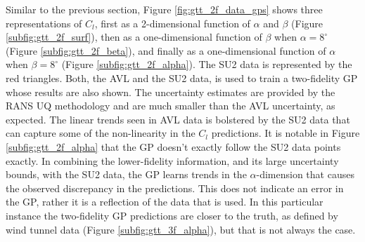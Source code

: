 Similar to the previous section, Figure \ref{fig:gtt_2f_data_gps} shows three representations of $C_l$, first as a 2-dimensional function of $\alpha$ and $\beta$ (Figure \ref{subfig:gtt_2f_surf}), then as a one-dimensional function of $\beta$ when $\alpha=8^\circ$ (Figure \ref{subfig:gtt_2f_beta}), and finally as a one-dimensional function of $\alpha$ when $\beta = 8^\circ$ (Figure \ref{subfig:gtt_2f_alpha}).
The SU2 data is represented by the red triangles. 
Both, the AVL and the SU2 data, is used to train a two-fidelity GP whose results are also shown. 
The uncertainty estimates are provided by the RANS UQ methodology and are much smaller than the AVL uncertainty, as expected. 
The linear trends seen in AVL data is bolstered by the SU2 data that can capture some of the non-linearity in the $C_l$ predictions. 
It is notable in Figure \ref{subfig:gtt_2f_alpha} that the GP doesn't exactly follow the SU2 data points exactly. 
In combining the lower-fidelity information, and its large uncertainty bounds, with the SU2 data, the GP learns trends in the $\alpha$-dimension that causes the observed discrepancy in the predictions. 
This does not indicate an error in the GP, rather it is a reflection of the data that is used. 
In this particular instance the two-fidelity GP predictions are closer to the truth, as defined by wind tunnel data (Figure \ref{subfig:gtt_3f_alpha}), but that is not always the case.

